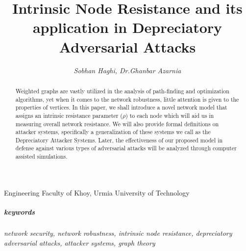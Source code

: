 \documentclass{article}
\date{\vspace{-4ex}}
\begin{document}
	\title{\textbf{Intrinsic Node Resistance and its application in Depreciatory Adversarial Attacks}}
	\author{\emph{Sobhan Haghi, Dr.Ghanbar Azarnia}}
	\maketitle
	
	\large{Engineering Faculty of Khoy, Urmia University of Technology}\\
	
	\begin{abstract}
		\centering
		Weighted graphs are vastly utilized in the analysis of path-finding and optimization algorithms, yet when it comes to the network robustness, little attention is given to the properties of vertices. In this paper, we shall introduce a novel network model that assigns an intrinsic resistance parameter ($\rho$) to each node which will aid us in measuring overall network resistance. We will also provide formal definitions on attacker systems, specifically a generalization of these systems we call as the Depreciatory Attacker Systems. Later, the effectiveness of our proposed model in defense against various types of adversarial attacks will be analyzed through computer assisted simulations.
	\end{abstract}
	
	\subparagraph{keywords}\textit{network security, network robustness, intrinsic node resistance, depreciatory adversarial attacks, attacker systems, graph theory}
	
\end{document}
